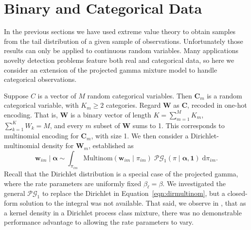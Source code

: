 \section{Binary and Categorical Data\label{sec:categorical}}
In the previous sections we have used extreme value theory to obtain samples
    from the tail distribution of a given sample of observations. Unfortunately 
    those results can only be applied to continuous random variables.
    Many applications novelty detection problems feature both real and categorical 
    data, so here we consider an extension of the projected gamma mixture model to 
    handle categorical observations. 

Suppose $C$ is a vector of $M$ random categorical variables.  Then $\bm{C}_{m}$ 
    is a random categorical variable, with $K_{m} \geq 2$ categories. Regard $\bm{W}$ 
    as $\bm{C}$, recoded in one-hot encoding.  That is, $\bm{W}$ is a binary vector of 
    length $K = \sum_{m = 1}^M K_{m}$, $\sum_{k = 1}^K W_k = M$, and every $m$ subset 
    of $\bm{W}$ sums to 1.  This corresponds to multinomial encoding for $\bm{C}_m$,
    with size 1. We then consider a Dirichlet-multinomial density for $\bm{W}_m$,
    established as 
    \begin{equation}
        \label{eqn:dirmultinom}
        \bm{w}_{im}\mid\bm{\alpha} 
        \sim 
        \int_{\pi_{im}} 
        \text{Multinom}(\bm{w}_{im}\mid\pi_{im})\;
        \mathcal{PG}_1(\pi\mid\bm{\alpha},\bm{1})\;\text{d}\pi_{im}.
    \end{equation}
    Recall that the Dirichlet distribution is a special case of the projected gamma,
    where the rate parameters are uniformly fixed $\beta_{\ell} = \beta$.  We 
    investigated the general $\mathcal{PG}_1$ to replace the Dirichlet in 
    Equation~\ref{eqn:dirmultinom}, but a closed-form solution to the integral was 
    not available.  That said, we observe in \cite{trubey:pg}, that as a kernel 
    density in a Dirichlet process class mixture, there was no demonstrable performance 
    advantage to allowing the rate parameters to vary.
 
